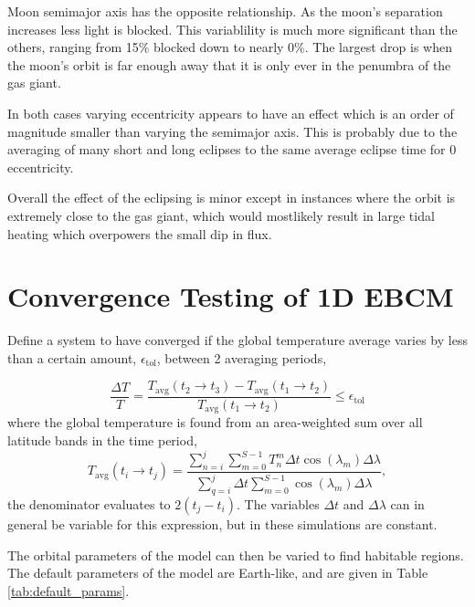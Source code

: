 \documentclass[12pt, onecolumn]{revtex4-2}    %
\begin{document}
Moon semimajor axis has the opposite relationship.
As the moon's separation increases less light is blocked.
This variablility is much more significant than the others, ranging from 15\% blocked down to nearly 0\%.
The largest drop is when the moon's orbit is far enough away that it is only ever in the penumbra of the gas giant.

In both cases varying eccentricity appears to have an effect which is an order of magnitude smaller than varying the semimajor axis.
This is probably due to the averaging of many short and long eclipses to the same average eclipse time for 0 eccentricity.

Overall the effect of the eclipsing is minor except in instances where the orbit is extremely close to the gas giant, which would mostlikely result in large tidal heating which overpowers the small dip in flux.


\section{Convergence Testing of 1D EBCM} \label{sec:conv_testing}

Define a system to have converged if the global temperature average varies by less than a certain amount, $\epsilon_{\text{tol}}$, between 2 averaging periods,

\begin{equation*}
    \frac{\Delta T}{T} = \frac{T_{\text{avg}}(t_2 \to t_3) - T_{\text{avg}}(t_1 \to t_2)}{T_{\text{avg}}(t_1 \to t_2)}
    \le \epsilon_{\text{tol}}
\end{equation*}
where the global temperature is found from an area-weighted sum over all latitude bands in the time period,
\begin{equation}
    T_{\text{avg}}(t_i \to t_j) = \frac{\sum_{n = i}^{j} \sum_{m = 0}^{S-1} T^m_n \Delta t \cos(\lambda_m)\Delta \lambda}{\sum_{q = i}^{j} \Delta t \sum_{m=0}^{S-1} \cos(\lambda_m)\Delta \lambda},
\end{equation}
the denominator evaluates to $2 (t_j - t_i)$. The variables $\Delta t$ and $\Delta \lambda$ can in general be variable for this expression, but in these simulations are constant.

The orbital parameters of the model can then be varied to find habitable regions. The default parameters of the model are Earth-like, and are given in Table \ref{tab:default_params}.
\end{document}
